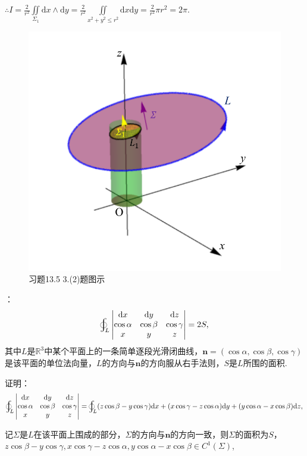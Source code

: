 \documentclass[12pt,UTF8]{ctexart}
\newcommand{\varIInt}[4]{\iint\limits_{#1}#2\mathrm d#3\mathrm d#4}
\newcommand{\BLOInt}[2]{\varoint\nolimits_{#1}#2}
\newcommand{\md}[1]{\mathrm d#1}
\newcommand{\BSIInt}[2]{\iint\limits_{#1}#2}
\begin{document}
\begin{enumerate}
$\therefore I=\frac 2{r^2}\BSIInt{\Sigma_1}{\md x\wedge\md y}=\frac2{r^2}\varIInt{x^2+y^2\leqslant r^2}{}xy=\frac2{r^2}\pi r^2=2\pi$.
\begin{figure}[H]
\begin{center}
\includegraphics[height=0.7\textheight]{Figures24/Fig13-5-3-2.pdf}
\end{center}
\caption{习题13.5 3.(2)题图示}
\label{13-5-3-2}
\end{figure}
：
\[
\BLOInt L{\begin{vmatrix}
\md x&\md y&\md z\\
\cos\alpha&\cos\beta&\cos\gamma\\
x&y&z
\end{vmatrix}}=2S,
\]
其中$L$是$\mathbb R^3$中某个平面上的一条简单逐段光滑闭曲线，$\bm n=(\cos\alpha,\cos\beta,\cos\gamma)$是该平面的单位法向量，$L$的方向与$\bm n$的方向服从右手法则，$S$是$L$所围的面积.

证明：\[
\BLOInt L{\begin{vmatrix}
\md x&\md y&\md z\\
\cos\alpha&\cos\beta&\cos\gamma\\
x&y&z
\end{vmatrix}}=\BLOInt L{(z\cos\beta-y\cos\gamma)\md x+(x\cos\gamma-z\cos\alpha)\md y+(y\cos\alpha-x\cos\beta)\md z},
\]


记$\Sigma$是$L$在该平面上围成的部分，$\Sigma$的方向与$\bm n$的方向一致，则$\Sigma$的面积为$S$，$z\cos\beta-y\cos\gamma,x\cos\gamma-z\cos\alpha,y\cos\alpha-x\cos\beta\in C^1(\Sigma)$,


\end{enumerate}
\end{document}
